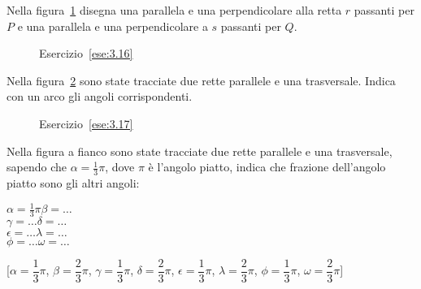 \begin{esercizio}
\label{ese:3.16}
Nella figura~\ref{fig:ese3.16} disegna una parallela e una 
perpendicolare alla retta $r$ passanti per $P$ e una parallela e una 
perpendicolare a $s$ passanti per $Q$.
\end{esercizio}

\begin{inaccessibleblock}
 \begin{figure}[htb]
\centering
\caption{Esercizio~\ref{ese:3.16}}\label{fig:ese3.16}
\end{figure}
\end{inaccessibleblock}

\begin{esercizio}
\label{ese:3.17}
Nella figura~\ref{fig:ese3.17} sono state tracciate due rette 
parallele e una trasversale. Indica con un arco gli angoli 
corrispondenti.
\end{esercizio}

\begin{inaccessibleblock}
 \begin{figure}[htb]
\centering
\caption{Esercizio~\ref{ese:3.17}}\label{fig:ese3.17}
\end{figure}
\end{inaccessibleblock}

\begin{esercizio}
\label{ese:3.18}
Nella figura a fianco sono state tracciate due rette parallele e una 
trasversale, sapendo che $\alpha=\frac{1}{3}\pi$, dove $\pi$ è 
l'angolo piatto, indica che frazione dell'angolo piatto sono gli 
altri angoli:\\
\noindent\begin{minipage}{.5\textwidth}
$\alpha=\frac{1}{3}\pi$\tab\tab $\beta = \ldots$\\
$\gamma=\ldots$\tab\tab $\delta = \ldots$\\
$\epsilon=\ldots$\tab\tab $\lambda = \ldots$\\
$\phi=\ldots$\tab\tab $\omega = \ldots$
\end{minipage}\hfil
\begin{minipage}{.5\textwidth}
\centering
\end{minipage}
\hfill [$\alpha=\dfrac{1}{3}\pi$, $\beta=\dfrac{2}{3}\pi$, 
$\gamma=\dfrac{1}{3}\pi$, $\delta=\dfrac{2}{3}\pi$, 
$\epsilon=\dfrac{1}{3}\pi$, $\lambda=\dfrac{2}{3}\pi$, 
$\phi=\dfrac{1}{3}\pi$, $\omega=\dfrac{2}{3}\pi$]
\end{esercizio}

